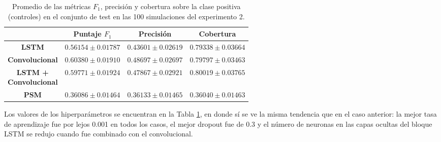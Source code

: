 \documentclass[../../main.tex]{subfiles}
\begin{document}
\begin{table}[H]
    \centering
    \renewcommand{\arraystretch}{1.2}
    \begin{tabular}{|c|c|c|c|}
        \hline
         & \textbf{Puntaje} \(F_1\) & \textbf{Precisión} & \textbf{Cobertura} \\ \hline\hline
        \textbf{LSTM}
            & $0.56154 \pm 0.01787$ & $0.43601 \pm 0.02619$ & $0.79338 \pm 0.03664$ \\ \hline
        \textbf{Convolucional}
            & $\mathbf{0.60380 \pm 0.01910}$ & $\mathbf{0.48697 \pm 0.02697}$ & $0.79797 \pm 0.03463$ \\ \hline
        \makecell{\textbf{LSTM +} \\ \textbf{Convolucional}}
            & $0.59771 \pm 0.01924$ & $0.47867 \pm 0.02921$ & $\mathbf{0.80019 \pm 0.03765}$ \\ \hline
        \textbf{PSM}
            & $0.36086 \pm 0.01464$ & $0.36133 \pm 0.01465$ & $0.36040 \pm 0.01463$ \\
        \hline
    \end{tabular}
    \caption{Promedio de las métricas \(F_1\), precisión y cobertura sobre la
    clase positiva (controles) en el conjunto de test en las 100 simulaciones del
    experimento 2.}
    \label{tab:results_exp2}
\end{table}

Los valores de los hiperparámetros se encuentran en la Tabla \ref{tab:results_exp2}, en
donde sí se ve la misma tendencia que en el caso anterior: la mejor tasa de aprendizaje
fue por lejos 0.001 en todos los casos, el mejor dropout fue de 0.3 y el número de
neuronas en las capas ocultas del bloque LSTM se redujo cuando fue combinado con el
convolucional.
\end{document}
